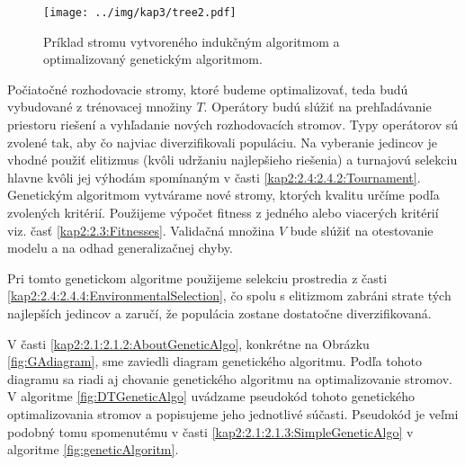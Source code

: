 \begin{figure}[h]
\centering
\centerline{\mbox{\texttt{[image: ../img/kap3/tree2.pdf]}}}
\caption{Príklad stromu vytvoreného indukčným algoritmom a optimalizovaný genetickým algoritmom.}\label{fig:treeGA}
\end{figure}

Počiatočné rozhodovacie stromy, ktoré budeme optimalizovať, teda budú vybudované z trénovacej množiny $T$. Operátory budú slúžiť na prehľadávanie priestoru riešení a vyhľadanie nových rozhodovacích stromov. Typy operátorov sú zvolené tak, aby čo najviac diverzifikovali populáciu. Na vyberanie jedincov je vhodné použiť elitizmus (kvôli udržaniu najlepšieho riešenia) a turnajovú selekciu hlavne kvôli jej výhodám spomínaným v časti \ref{kap2:2.4:2.4.2:Tournament}. Genetickým algoritmom vytvárame nové stromy, ktorých kvalitu určíme podľa zvolených kritérií. Použijeme výpočet fitness z jedného alebo viacerých kritérií viz. časť \ref{kap2:2.3:Fitnesses}. Validačná množina $V$ bude slúžiť na otestovanie modelu a na odhad generalizačnej chyby.

Pri tomto genetickom algoritme použijeme selekciu prostredia z časti \ref{kap2:2.4:2.4.4:EnvironmentalSelection}, čo spolu s elitizmom zabráni strate tých najlepších jedincov a zaručí, že populácia zostane dostatočne diverzifikovaná.

V časti \ref{kap2:2.1:2.1.2:AboutGeneticAlgo}, konkrétne na Obrázku \ref{fig:GAdiagram}, sme zaviedli diagram genetického algoritmu. Podľa tohoto diagramu sa riadi aj chovanie genetického algoritmu na optimalizovanie stromov.
V algoritme \ref{fig:DTGeneticAlgo} uvádzame pseudokód tohoto genetického optimalizovania stromov a popisujeme jeho jednotlivé súčasti.
Pseudokód je veľmi podobný tomu spomenutému v časti \ref{kap2:2.1:2.1.3:SimpleGeneticAlgo} v algoritme \ref{fig:geneticAlgoritm}.

